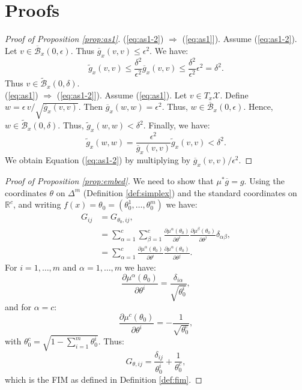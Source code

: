 \documentclass[entropy,article,submit,pdftex,moreauthors]{Definitions/mdpi}
\newcommand{\R}{\ensuremath{\mathbb{R}}}
\theoremstyle{plain}
\theoremstyle{definition}
\newcommand{\B}{\mathcal{B}}
\newcommand{\X}{\mathcal{X}}
\newcommand{\gb}{\overline{g}}
\begin{document}
\section{Proofs}
\label{sec:proof}

\begin{proof}[Proof of Proposition \ref{prop:as1}]
    (\ref{eq:as1-2}) $\Rightarrow$ (\ref{eq:as1}]). Assume (\ref{eq:as1-2}). Let $v \in \overline{\B}_x(0, \epsilon)$. Thus $\gb_x(v,v) \leq \epsilon^2$. We have:
    \begin{equation*}
        \tilde{g}_x(v,v) \leq \frac{\delta^2}{\epsilon^2} \gb_x(v,v) \leq \frac{\delta^2}{\epsilon^2} \epsilon^2 = \delta^2.
    \end{equation*}
    Thus $v \in \widetilde{\B}_x(0, \delta)$. \\
    (\ref{eq:as1}) $\Rightarrow$ (\ref{eq:as1-2}]). Assume (\ref{eq:as1}). Let $v \in T_x\X$. Define $w = \epsilon \, v / \sqrt{\gb_x(v,v)}$. Then $\gb_x(w,w) = \epsilon^2$. Thus, $w \in \overline{\B}_x(0, \epsilon)$. Hence, $w \in \widetilde{\B}_x(0, \delta)$. Thus, $\tilde{g}_x(w,w) < \delta^2$. Finally, we have:
    \begin{equation*}
        \tilde{g}_x(w,w) = \frac{\epsilon^2}{\gb_x(v,v)} \tilde{g}_x(v,v) < \delta^2.
    \end{equation*}
    We obtain Equation (\ref{eq:as1-2}) by multiplying by $\gb_x(v,v)/\epsilon^2$.
\end{proof}

\begin{proof}[Proof of Proposition \ref{prop:embed}]
    We need to show that $\mu^* \gb = g$. Using the coordinates $\theta$ on $\Delta^m$ (Definition \ref{def:simplex}) and the standard coordinates on $\R^c$, and writing $f(x) = \theta_0 = (\theta^1_0, \dots, \theta^m_0)$ we have:
    \begin{align*}
        G_{ij} &= G_{\theta_0, ij}, \\
        &= \sum_{\alpha=1}^c \sum_{\beta=1}^c \frac{\partial \mu^\alpha(\theta_0)}{\partial \theta^i} \frac{\partial \mu^\beta(\theta_0)}{\partial \theta^j} \delta_{\alpha \beta}, \\
        &= \sum_{\alpha=1}^c \frac{\partial \mu^\alpha(\theta_0)}{\partial \theta^i} \frac{\partial \mu^\alpha(\theta_0)}{\partial \theta^j}.
    \end{align*}
    For $i=1, \dots, m$ and $\alpha=1, \dots, m$ we have:
    \begin{equation*}
        \frac{\partial \mu^\alpha(\theta_0)}{\partial \theta^i} = \frac{\delta_{i \alpha}}{\sqrt{\theta^i_0}},
    \end{equation*}
    and for $\alpha = c$:
    \begin{equation*}
        \frac{\partial \mu^c(\theta_0)}{\partial \theta^i} = -\frac{1}{\sqrt{\theta^c_0}},
    \end{equation*}
    with $\theta^c_0 = \sqrt{1 - \sum_{i=1}^m \theta^i_0}$. Thus:
    \begin{equation*}
        G_{\theta, ij} = \frac{\delta_{ij}}{\theta^i_0} + \frac{1}{\theta^c_0},
    \end{equation*}
    which is the FIM as defined in Definition \ref{def:fim}.
\end{proof}
\end{document}
